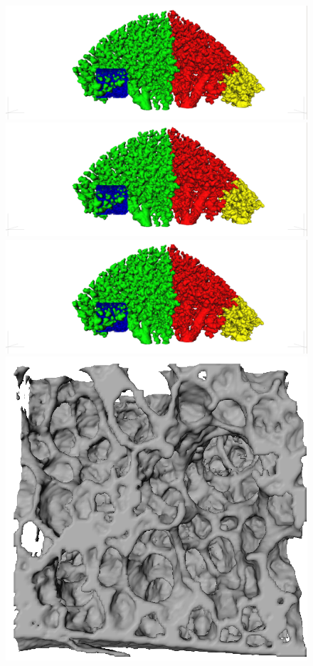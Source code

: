 	\begin{figure}[htp]
		\centering
		\renewcommand{\imsize}{.333\linewidth}%
		\includegraphics[width=\imagewidth]{img/comparisonBvsT/ob}%
		\includegraphics[width=\imagewidth]{img/comparisonBvsT/ol}%
		\includegraphics[width=\imagewidth]{img/comparisonBvsT/ot}%
		\\%
		\includegraphics[width=\imagewidth]{img/comparisonBvsT/roiB}%

\end{figure}
